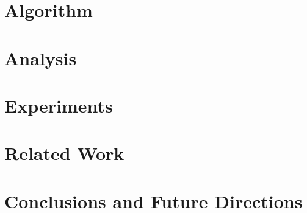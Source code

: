 \documentclass[letterpaper]{article} %
\begin{document}
\section{Algorithm}
\label{sec:algorithm}


\section{Analysis}
\label{sec:analysis}


\section{Experiments}
\label{sec:expt}


\section{Related Work}
\label{sec:related}


\section{Conclusions and Future Directions}
\label{sec:conclusions}


\newpage




\appendix

\end{document}
